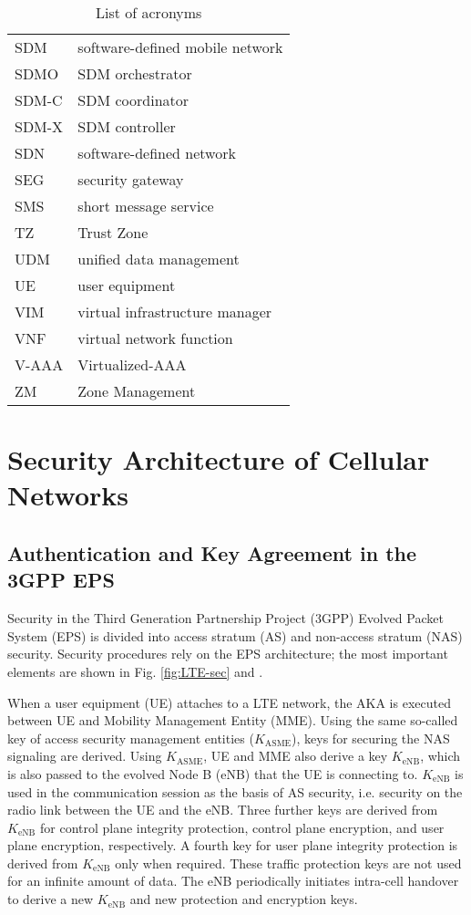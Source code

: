 \documentclass{ieeeaccess}
\newcommand{\change}[1]{#1}
\begin{document}
\begin{table}[!htbp]
\begin{tabular}{ll}
			SDM&software-defined mobile network\\
			SDMO&SDM orchestrator\\
			SDM-C&SDM coordinator\\
			SDM-X&SDM controller\\
			SDN&software-defined network\\
			SEG&security gateway\\
			SMS&short message service\\
			TZ&Trust Zone\\
			UDM&unified data management \\
			UE&user equipment\\
			VIM&virtual infrastructure manager\\
			VNF&virtual network function\\
			V-AAA&Virtualized-AAA\\
			ZM&Zone Management\\
			\bottomrule[1.5px]
		\end{tabular}
		\caption{List of acronyms}
	\end{table}
	
	\section{Security Architecture of Cellular Networks}\label{sec:state_of_the_art}
	\subsection{Authentication and Key Agreement in the 3GPP EPS}
	Security in the Third Generation Partnership Project (3GPP) Evolved Packet System (EPS) is divided into access stratum (AS) and non-access stratum (NAS) security. Security procedures rely on the EPS architecture; the most important elements are shown in Fig. \ref{fig:LTE-sec} and \cite{3gpp-33401,3gpp-33402}. 
	
	When a user equipment (UE) attaches to a LTE network, the AKA is executed between UE and Mobility Management Entity (MME). \change{Using the same so-called key of access security management entities ($K_{\text{ASME}}$), keys for securing the NAS signaling are derived. Using $K_{\text{ASME}}$, UE and MME also derive a key $K_{\mathrm{eNB}}$, which is also passed to the evolved Node B (eNB) that the UE is connecting to. $K_{\mathrm{eNB}}$} is used in the communication session as the basis of AS security, i.e. security on the radio link between the UE and the eNB. Three further keys are derived from $K_{\mathrm{eNB}}$ \change{for control plane integrity protection, control plane encryption, and user plane encryption, respectively. A fourth key for user plane integrity protection is derived from $K_{\mathrm{eNB}}$ only when required. These traffic protection keys are not used for an infinite amount of data. The eNB periodically initiates intra-cell handover to derive a new $K_{\mathrm{eNB}}$ and new protection and encryption keys. }
	
\end{document}

